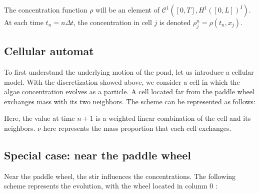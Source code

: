\documentclass{article}
\begin{document}
The concentration function $\rho$ will be an element of \(\mathcal{C}^1([0, T], H^1([0, L])^I)\). At each time \( t_n = n \Delta t \), the concentration in cell \( j\) is denoted \( \rho_j^n = \rho(t_n, x_j)\). \\

\subsection{Cellular automat}

To first understand the underlying motion of the pond, let us introduce a cellular model. With the discretization showed above, we consider a cell in which the algae concentration evolves as a particle. A cell located far from the paddle wheel exchanges mass with its two neighbors. The scheme can be represented as follows:

\begin{center}
\end{center}

Here, the value at time \( n+1 \) is a weighted linear combination of the cell and its neighbors. $\nu$ here represents the mass proportion that each cell exchanges. 

\subsection{Special case: near the paddle wheel}

Near the paddle wheel, the stir influences the concentrations. The following scheme represents the evolution, with the wheel located in column 0 :
\end{document}
